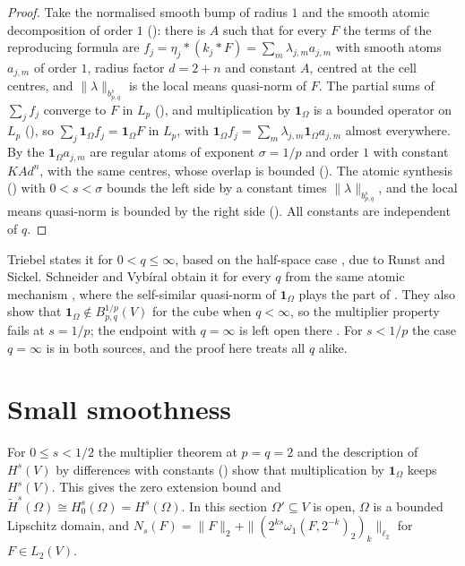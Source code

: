 \begin{proof}
\leanok
Take the normalised smooth bump of radius $1$ and the smooth atomic decomposition of order $1$
(): there is $A$ such that for every $F$ the terms of the
reproducing formula are $f_j = \eta_j * (k_j * F) = \sum_m \lambda_{j,m} a_{j,m}$ with smooth
atoms $a_{j,m}$ of order $1$, radius factor $d = 2 + n$ and constant $A$, centred at the cell
centres, and $\|\lambda\|_{b^s_{p,q}}$ is the local means quasi-norm of $F$. The partial sums of
$\sum_j f_j$ converge to $F$ in $L_p$ (), and multiplication by
$\mathbf 1_\Omega$ is a bounded operator on $L_p$ (), so
$\sum_j \mathbf 1_\Omega f_j = \mathbf 1_\Omega F$ in $L_p$, with
$\mathbf 1_\Omega f_j = \sum_m \lambda_{j,m} \mathbf 1_\Omega a_{j,m}$ almost everywhere. By
 the $\mathbf 1_\Omega a_{j,m}$ are regular atoms of exponent
$\sigma = 1/p$ and order $1$ with constant $K A d^n$, with the same centres, whose overlap is
bounded (). The atomic synthesis () with
$0 < s < \sigma$ bounds the left side by a constant times $\|\lambda\|_{b^s_{p,q}}$, and the local
means quasi-norm is bounded by the right side (). All constants are
independent of $q$.
\end{proof}

Triebel states it for $0 < q \leq \infty$, based on the half-space case
\cite[Proposition 5.1]{Triebel2002}, due to Runst and Sickel. Schneider and Vybíral obtain it for
every $q$ from the same atomic mechanism \cite[Theorem 5.4(i) and Remark 5.10]{SchneiderVybiral},
where the self-similar quasi-norm of $\mathbf 1_\Omega$ plays the part of
. They also show that $\mathbf 1_\Omega \notin B^{1/p}_{p,q}(V)$
for the cube when $q < \infty$, so the multiplier property fails at $s = 1/p$; the endpoint with
$q = \infty$ is left open there \cite[p.~31]{SchneiderVybiral}. For $s < 1/p$ the case
$q = \infty$ is in both sources, and the proof here treats all $q$ alike.

\section{Small smoothness}
\label{sec:zero-extension-small}

For $0 \leq s < 1/2$ the multiplier theorem at $p = q = 2$ and the description of $H^s(V)$ by
differences with constants () show that multiplication by
$\mathbf 1_\Omega$ keeps $H^s(V)$. This gives the zero extension bound and
$\tilde H^s(\Omega) \cong H^s_0(\Omega) = H^s(\Omega)$. In this section $\Omega' \subseteq V$ is
open, $\Omega$ is a bounded Lipschitz domain, and
$N_s(F) = \|F\|_2 + \|(2^{ks} \omega_1(F, 2^{-k})_2)_k\|_{\ell_2}$ for $F \in L_2(V)$.

